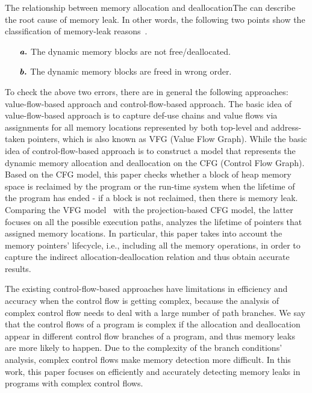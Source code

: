 The relationship between memory allocation and deallocationThe can describe the root cause of memory leak. In other words, the following two points show the classification of memory-leak reasons~\cite{LCW13}.
\begin{itemize}
\item[$\textbf{\emph{a.}}$]The dynamic memory blocks are not free/deallocated.
\item[$\textbf{\emph{b.}}$]The dynamic memory blocks are freed in wrong order.
\end{itemize}

To check the above two errors, there are in general the following approaches: value-flow-based approach and control-flow-based approach. The basic idea of value-flow-based approach is to capture def-use chains and value flows via assignments for all memory locations represented by both top-level and address-taken pointers, which is also known as VFG (Value Flow Graph). While the basic idea of control-flow-based approach is to construct a model that represents the dynamic memory allocation and deallocation on the CFG (Control Flow Graph). Based on the CFG model, this paper checks whether a block of heap memory space is reclaimed by the program or the run-time system when the lifetime of the program has ended - if a block is not reclaimed, then there is memory leak. Comparing the VFG model~\cite{SYX12} with the projection-based CFG model, the latter focuses on all the possible execution paths, analyzes the lifetime of pointers that assigned memory locations. %
In particular, this paper takes into account the memory pointers' lifecycle, i.e., including all the memory operations, in order to capture the indirect allocation-deallocation relation and thus obtain accurate results.

The existing control-flow-based approaches have limitations in efficiency and accuracy when the control flow is getting complex, because the analysis of complex control flow needs to deal with a large number of path branches. %
We say that the control flows of a program is complex if the allocation and deallocation appear in different control flow branches of a program, and thus memory leaks are more likely to happen. Due to the complexity of the branch conditions' analysis, complex control flows make memory detection more difficult. %
In this work, this paper focuses on efficiently and accurately detecting memory leaks in programs with complex control flows.  

